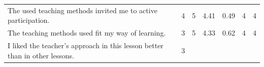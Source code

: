 \documentclass[paper=a4,justified,a4paper]{tufte-handout}
\begin{document}
\begin{longtable}[]{@{}lllllll@{}}
\begin{minipage}[t]{0.18\columnwidth}
\scriptsize The used teaching methods invited me to active
participation.\strut
\end{minipage} & \begin{minipage}[t]{0.07\columnwidth}\raggedright
4\strut
\end{minipage} & \begin{minipage}[t]{0.07\columnwidth}\raggedright
5\strut
\end{minipage} & \begin{minipage}[t]{0.09\columnwidth}\raggedright
4.41\strut
\end{minipage} & \begin{minipage}[t]{0.18\columnwidth}\raggedright
0.49\strut
\end{minipage} & \begin{minipage}[t]{0.13\columnwidth}\raggedright
4\strut
\end{minipage} & \begin{minipage}[t]{0.09\columnwidth}\raggedright
4\strut
\end{minipage}\tabularnewline
\begin{minipage}[t]{0.18\columnwidth}\raggedright
\scriptsize The teaching methods used fit my way of learning.\strut
\end{minipage} & \begin{minipage}[t]{0.07\columnwidth}\raggedright
3\strut
\end{minipage} & \begin{minipage}[t]{0.07\columnwidth}\raggedright
5\strut
\end{minipage} & \begin{minipage}[t]{0.09\columnwidth}\raggedright
4.33\strut
\end{minipage} & \begin{minipage}[t]{0.18\columnwidth}\raggedright
0.62\strut
\end{minipage} & \begin{minipage}[t]{0.13\columnwidth}\raggedright
4\strut
\end{minipage} & \begin{minipage}[t]{0.09\columnwidth}\raggedright
4\strut
\end{minipage}\tabularnewline
\begin{minipage}[t]{0.18\columnwidth}\raggedright
\scriptsize I liked the teacher's approach in this lesson better than in
other lessons.\strut
\end{minipage} & \begin{minipage}[t]{0.07\columnwidth}\raggedright
3\strut
\end{minipage} & \begin{minipage}[t]{0.07\columnwidth}\raggedright

\end{minipage}
\end{longtable}
\end{document}
